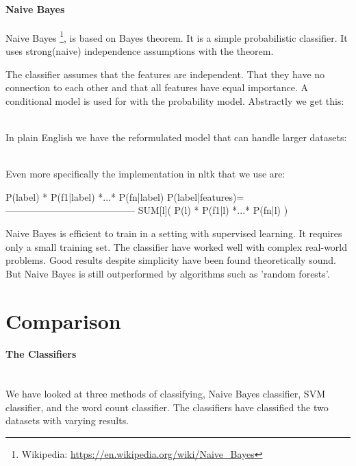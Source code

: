 \paragraph{Naive Bayes}\label{sentiment:naive_bayes_classification}
Naive Bayes \footnote{Wikipedia:
\url{https://en.wikipedia.org/wiki/Naive_Bayes}}, is based on Bayes theorem. It
is a simple probabilistic classifier. It uses strong(naive) independence
assumptions with the theorem.

The classifier assumes that the features are independent. That they have no
connection to each other and that all features have equal importance. 
A conditional model is used for with the probability model. Abstractly we get
this: 

\\

In plain English we have the reformulated model that can handle larger datasets:

\\

Even more specifically the implementation in nltk that we use are: 
\begin{python}
                   P(label) * P(f1|label) *...* P(fn|label)
P(label|features)=-----------------------------------------
                   SUM[l]( P(l) * P(f1|l) *...* P(fn|l) )
\end{python}

Naive Bayes is efficient to train in a setting with supervised
learning. It requires only a small training set. The classifier have worked well
with complex real-world problems. Good results despite simplicity have been
found theoretically sound. But Naive Bayes is still outperformed by algorithms
such as 'random forests'.
%

\section{Comparison}\label{sentiment:comparison_results}
\paragraph{The Classifiers}
\hspace{0pt}\\
We have looked at three methods of classifying, Naive Bayes classifier, SVM
classifier, and the word count classifier.
The classifiers have classified the two datasets with varying results. 

